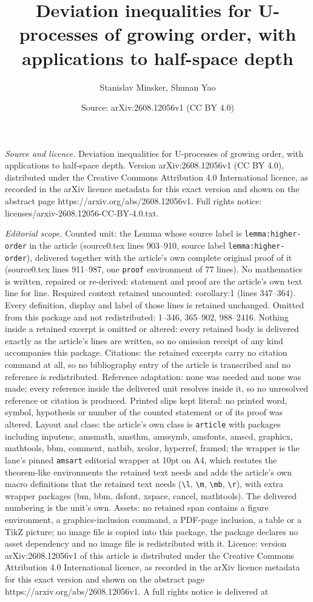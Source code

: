 \documentclass[10pt,a4paper]{amsart}
\title[Deviation inequalities for U-processes of growing order, wit]{Deviation inequalities for U-processes of growing order, with applications to half-space depth}
\author{Stanislav Minsker, Shunan Yao}
\date{Source: arXiv:2608.12056v1 (CC BY 4.0)}
\begin{document}
\maketitle

\noindent\emph{Source and licence.} Deviation inequalities for U-processes of growing order, with applications to half-space depth. Version arXiv:2608.12056v1 (CC BY 4.0), distributed under the Creative Commons Attribution 4.0 International licence, as recorded in the arXiv licence metadata for this exact version and shown on the abstract page https://arxiv.org/abs/2608.12056v1. Full rights notice: licenses/arxiv-2608.12056-CC-BY-4.0.txt.\par\smallskip

\noindent\textit{Editorial scope.} Counted unit: the Lemma whose source label is \texttt{lemma:higher-order} in the article (source0.tex lines 903--910, source label \texttt{lemma:higher-order}), delivered together with the article's own complete original proof of it (source0.tex lines 911--987, one \texttt{proof} environment of 77 lines). No mathematics is written, repaired or re-derived: statement and proof are the article's own text line for line. Required context retained uncounted: corollary:1 (lines 347--364). Every definition, display and label of those lines is retained unchanged. Omitted from this package and not redistributed: 1--346, 365--902, 988--2416. Nothing inside a retained excerpt is omitted or altered: every retained body is delivered exactly as the article's lines are written, so no omission receipt of any kind accompanies this package. Citations: the retained excerpts carry no citation command at all, so no bibliography entry of the article is transcribed and no reference is redistributed. Reference adaptation: none was needed and none was made; every reference inside the delivered unit resolves inside it, so no unresolved reference or citation is produced. Printed slips kept literal: no printed word, symbol, hypothesis or number of the counted statement or of its proof was altered. Layout and class: the article's own class is \texttt{article} with packages including inputenc, amsmath, amsthm, amssymb, amsfonts, amscd, graphicx, mathtools, bbm, comment, natbib, xcolor, hyperref, framed; the wrapper is the lane's pinned \texttt{amsart} editorial wrapper at 10pt on A4, which restates the theorem-like environments the retained text needs and adds the article's own macro definitions that the retained text needs (\texttt{\textbackslash l}, \texttt{\textbackslash m}, \texttt{\textbackslash mb}, \texttt{\textbackslash r}), with extra wrapper packages (bm, bbm, dsfont, xspace, cancel, mathtools). The delivered numbering is the unit's own. Assets: no retained span contains a figure environment, a graphics-inclusion command, a PDF-page inclusion, a table or a TikZ picture; no image file is copied into this package, the package declares no asset dependency and no image file is redistributed with it. Licence: version arXiv:2608.12056v1 of this article is distributed under the Creative Commons Attribution 4.0 International licence, as recorded in the arXiv licence metadata for this exact version and shown on the abstract page https://arxiv.org/abs/2608.12056v1. A full rights notice is delivered at 
\end{document}
